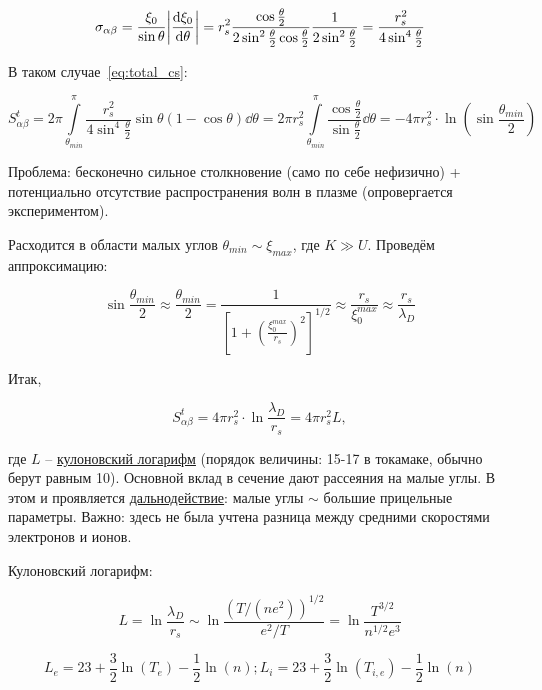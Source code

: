 \documentclass[10pt, a4paper]{article}
\begin{document}
\begin{equation*}
	\sigma_{\alpha\beta} = \frac{\xi_0}{\sin\theta}\abs{\dv{\xi_0}{\theta}} = r_s^2\frac{\cos\frac{\theta}{2}}{2\sin^2\frac{\theta}{2}\cos\frac{\theta}{2}}\frac{1}{2\sin^2\frac{\theta}{2}} = \frac{r_s^2}{4\sin^4\frac{\theta}{2}}
\end{equation*}

В таком случае~\eqref{eq:total_cs}:

\begin{equation*}
	S_{\alpha\beta}^t = 2\pi\int\limits_{\theta_{min}}^{\pi}\frac{r_s^2}{4\sin^4\frac{\theta}{2}}\sin\theta(1-\cos\theta)\dd\theta = 2\pi r_s^2\int\limits_{\theta_{min}}^{\pi} \frac{\cos\frac{\theta}{2}}{\sin\frac{\theta}{2}}\dd\theta = -4\pi r_s^2 \cdot \ln\left( \sin\frac{\theta_{min}}{2}\right) 
\end{equation*}

Проблема: бесконечно сильное столкновение (само по себе нефизично) + потенциально отсутствие распространения волн в плазме (опровергается экспериментом).

Расходится в области малых углов $\theta_{min}\sim\xi_{max}$, где $K\gg U$. Проведём аппроксимацию:

\begin{equation*}
	\sin\frac{\theta_{min}}{2}\approx \frac{\theta_{min}}{2} = \frac{1}{\left[ 1+\left( \frac{\xi_0^{max}}{r_s}\right)^2 \right]^{1/2}} \approx \frac{r_s}{\xi_0^{max}} \approx \frac{r_s}{\lambda_D}
\end{equation*}

Итак, 

\begin{equation*}
	S_{\alpha\beta}^t = 4\pi r_s^2 \cdot \ln\frac{\lambda_D}{r_s} = 4\pi r_s^2 L,
\end{equation*}

где $L$ -- \uline{кулоновский логарифм} (порядок величины: 15-17 в токамаке, обычно берут равным 10). Основной вклад в сечение дают рассеяния на малые углы. В этом и проявляется \uline{дальнодействие}: малые углы $\sim$ большие прицельные параметры. Важно: здесь не была учтена разница между средними скоростями электронов и ионов.

Кулоновский логарифм:

\begin{equation*}
	L = \ln\frac{\lambda_D}{r_s} \sim \ln\frac{(T/(ne^2))^{1/2}}{e^2/T} = \ln\frac{T^{3/2}}{n^{1/2}e^3}
\end{equation*}

\begin{equation} \label{eq:Coulomb_log}
	L_e = 23+\frac{3}{2}\ln(T_e)-\frac{1}{2}\ln(n); L_i = 23+
	\frac{3}{2}\ln(T_{i,e})-\frac{1}{2}\ln(n)
\end{equation}
\end{document}
